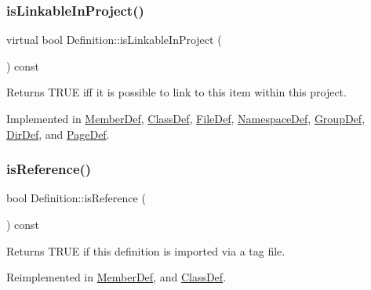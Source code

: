 \subsubsection{\texorpdfstring{isLinkableInProject()}{isLinkableInProject()}}
{\footnotesize\ttfamily virtual bool Definition\+::is\+Linkable\+In\+Project (\begin{DoxyParamCaption}{ }\end{DoxyParamCaption}) const\hspace{0.3cm}{\ttfamily [pure virtual]}}

Returns T\+R\+UE iff it is possible to link to this item within this project. 

Implemented in \mbox{\hyperlink{class_member_def_ab53677dd2218300ee758263ec23e8cbd}{Member\+Def}}, \mbox{\hyperlink{class_class_def_a54fd0971529bf396c31a2a5c67acbea7}{Class\+Def}}, \mbox{\hyperlink{class_file_def_ad8195d5d5b2be4f11d37e8d75f9e4659}{File\+Def}}, \mbox{\hyperlink{class_namespace_def_a3d9655e111c40aa7005ded973d6a8e89}{Namespace\+Def}}, \mbox{\hyperlink{class_group_def_a916a94699f6234e2bf5594ff12bbf764}{Group\+Def}}, \mbox{\hyperlink{class_dir_def_a9d0906d74985d67bbeccc91d7068d99c}{Dir\+Def}}, and \mbox{\hyperlink{class_page_def_a8aeb711470609d0be377c2b56aee9cef}{Page\+Def}}.

\mbox{\label{class_definition_a8405121cdc0253ec9633a87500ac47ba}} 
\subsubsection{\texorpdfstring{isReference()}{isReference()}}
{\footnotesize\ttfamily bool Definition\+::is\+Reference (\begin{DoxyParamCaption}{ }\end{DoxyParamCaption}) const\hspace{0.3cm}{\ttfamily [virtual]}}

Returns T\+R\+UE if this definition is imported via a tag file. 

Reimplemented in \mbox{\hyperlink{class_member_def_a285b80c1f135ce6ed9fa3a52e1435538}{Member\+Def}}, and \mbox{\hyperlink{class_class_def_a9a6dbef98acabb06d9e1792e3c82c800}{Class\+Def}}.

\mbox{\label{class_definition_adb6bab6d36c2b84b935442a7153b1135}} 
